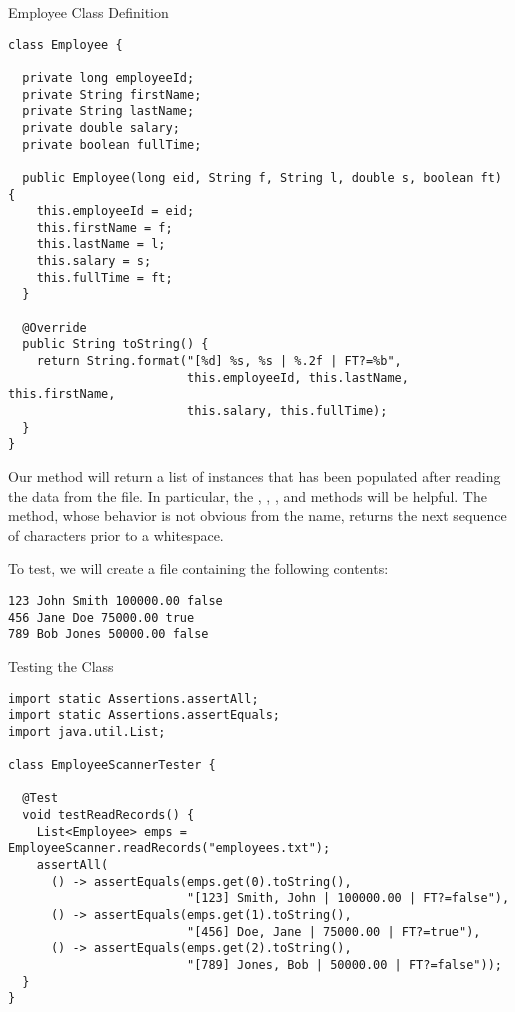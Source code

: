 \begin{cl}{Employee Class Definition}
\begin{lstlisting}[language=MyJava]
class Employee {

  private long employeeId;
  private String firstName;
  private String lastName;
  private double salary;
  private boolean fullTime;
  
  public Employee(long eid, String f, String l, double s, boolean ft) {
    this.employeeId = eid;
    this.firstName = f;
    this.lastName = l;
    this.salary = s;
    this.fullTime = ft;
  }

  @Override
  public String toString() {
    return String.format("[%d] %s, %s | %.2f | FT?=%b", 
                         this.employeeId, this.lastName, this.firstName, 
                         this.salary, this.fullTime);
  }
}
\end{lstlisting}
\end{cl}

Our method will return a list of  instances that has been populated after reading the data from the file. In particular, the , , , and  methods will be helpful. The  method, whose behavior is not obvious from the name, returns the next sequence of characters prior to a whitespace. 

To test, we will create a file containing the following contents:

\par{
\begin{verbatim}
123 John Smith 100000.00 false
456 Jane Doe 75000.00 true
789 Bob Jones 50000.00 false
\end{verbatim}
}

\begin{cl}{Testing the  Class}
\begin{lstlisting}[language=MyJava]
import static Assertions.assertAll;
import static Assertions.assertEquals;
import java.util.List;

class EmployeeScannerTester {

  @Test
  void testReadRecords() {
    List<Employee> emps = EmployeeScanner.readRecords("employees.txt");
    assertAll(
      () -> assertEquals(emps.get(0).toString(), 
                         "[123] Smith, John | 100000.00 | FT?=false"),
      () -> assertEquals(emps.get(1).toString(), 
                         "[456] Doe, Jane | 75000.00 | FT?=true"),
      () -> assertEquals(emps.get(2).toString(), 
                         "[789] Jones, Bob | 50000.00 | FT?=false"));
  }
}
\end{lstlisting}
\end{cl}


